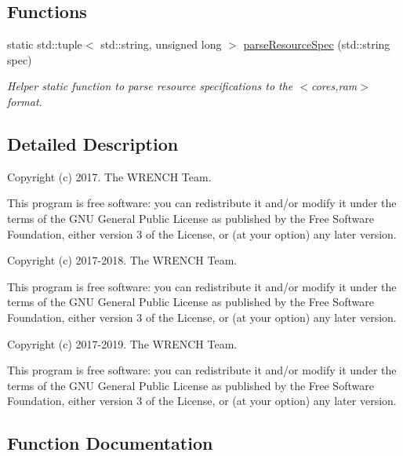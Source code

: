 \subsection*{Functions}
\begin{DoxyCompactItemize}
\item 
static std\+::tuple$<$ std\+::string, unsigned long $>$ \hyperlink{namespacewrench_a9601a7728120192951232d2e0a74a483}{parse\+Resource\+Spec} (std\+::string spec)
\begin{DoxyCompactList}\small\item\em Helper static function to parse resource specifications to the $<$cores,ram$>$ format. \end{DoxyCompactList}\end{DoxyCompactItemize}


\subsection{Detailed Description}
Copyright (c) 2017. The W\+R\+E\+N\+CH Team.

This program is free software\+: you can redistribute it and/or modify it under the terms of the G\+NU General Public License as published by the Free Software Foundation, either version 3 of the License, or (at your option) any later version.

Copyright (c) 2017-\/2018. The W\+R\+E\+N\+CH Team.

This program is free software\+: you can redistribute it and/or modify it under the terms of the G\+NU General Public License as published by the Free Software Foundation, either version 3 of the License, or (at your option) any later version.

Copyright (c) 2017-\/2019. The W\+R\+E\+N\+CH Team.

This program is free software\+: you can redistribute it and/or modify it under the terms of the G\+NU General Public License as published by the Free Software Foundation, either version 3 of the License, or (at your option) any later version. 

\subsection{Function Documentation}
\mbox{\label{namespacewrench_a9601a7728120192951232d2e0a74a483}} 
